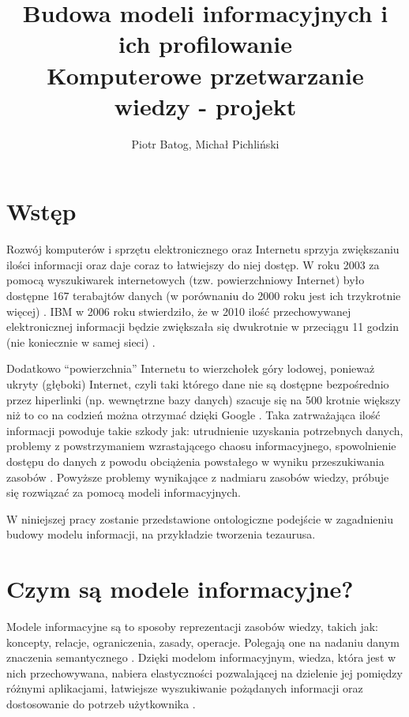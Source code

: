 \documentclass[12pt,a4paper,notitlepage]{article}
\title{Budowa modeli informacyjnych i ich profilowanie \\
  Komputerowe przetwarzanie wiedzy - projekt}
\author{Piotr Batog, Michał Pichliński}
\begin{document}

\maketitle

\section{Wstęp}
Rozwój komputerów i sprzętu elektronicznego oraz Internetu sprzyja zwiększaniu
ilości informacji oraz daje coraz to łatwiejszy do niej dostęp. W roku 2003
za pomocą wyszukiwarek internetowych (tzw. powierzchniowy Internet)
było dostępne 167 terabajtów danych (w porównaniu do 2000 roku jest ich
trzykrotnie więcej) \cite{HowMuchInformation}.
IBM w 2006 roku stwierdziło, że w 2010 ilość przechowywanej elektronicznej
informacji będzie zwiększała się dwukrotnie w przeciągu 11 godzin 
(nie koniecznie w samej sieci) \cite{ToxicTerabyte}.

Dodatkowo ``powierzchnia'' Internetu to wierzchołek góry lodowej, ponieważ
ukryty (głęboki) Internet, czyli taki którego dane nie są dostępne 
bezpośrednio przez hiperlinki (np. wewnętrzne bazy danych) szacuje się na 500
krotnie większy niż to co na codzień można otrzymać dzięki Google 
\cite{DeepWeb}. Taka zatrważająca ilość informacji powoduje takie szkody jak: 
utrudnienie uzyskania potrzebnych danych, problemy z powstrzymaniem
wzrastającego chaosu informacyjnego, spowolnienie dostępu do danych z powodu
obciążenia powstałego w wyniku przeszukiwania zasobów \cite{ToxicTerabyte}.
Powyższe problemy wynikające z nadmiaru zasobów wiedzy, próbuje się rozwiązać 
za pomocą modeli informacyjnych. 

W niniejszej pracy zostanie przedstawione ontologiczne podejście w zagadnieniu budowy modelu informacji, na przykładzie tworzenia tezaurusa. 

\section{Czym są modele informacyjne?}
Modele informacyjne są to sposoby reprezentacji zasobów wiedzy, takich jak:
koncepty, relacje, ograniczenia, zasady, operacje. Polegają one na nadaniu
danym znaczenia semantycznego \cite{Tina}. Dzięki modelom informacyjnym,
wiedza, która jest w nich przechowywana, nabiera elastyczności pozwalającej 
na dzielenie jej pomiędzy różnymi aplikacjami, łatwiejsze wyszukiwanie
pożądanych informacji oraz dostosowanie do potrzeb użytkownika 
\cite{GilbaneReport}.
\end{document}
